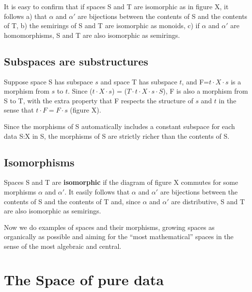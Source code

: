 \documentclass[11pt]{article}
\begin{document}
It is easy to confirm that if spaces S and T are isomorphic as in figure X, it follows a) that $\alpha$ and $\alpha'$ are bijections between the contents of S and the contents of T, b) the semirings of 
S and T are isomorphic as monoids, c) if $\alpha$ and $\alpha'$ are homomorphisms, S and T are also isomorphic as semirings.

\subsection{Subspaces are substructures} 

Suppose space S has subspace $s$ and space T has subspace $t$, and F=$t\cdot X\cdot s$ is a morphism from $s$ to $t$.   Since ($t\cdot X\cdot s$) = ($T\cdot t \cdot X\cdot s\cdot S$), 
F is also a morphism from S to T, with the extra property that F respects the structure of $s$ and $t$ in the sense that $t\cdot F=F\cdot s$ (figure X).

Since the morphisms of S automatically includes a constant subspace for each data S:X in S, the morphisms of S are strictly richer than the contents of S.  

\subsection{Isomorphisms} 

Spaces S and T are {\bf isomorphic} if the diagram of figure X commutes for some morphisms $\alpha$ and $\alpha'$.  It easily follows that $\alpha$ and $\alpha'$ are bijections between the contents of S and the contents of T and, since $\alpha$ and $\alpha'$ are distributive, S and T are also isomorphic as semirings.

Now we do examples of spaces and their morphisms, growing spaces as organically as possible and aiming for the ``most mathematical'' spaces in the sense of the most algebraic and central.

\section{The Space of pure data} 
\end{document}
